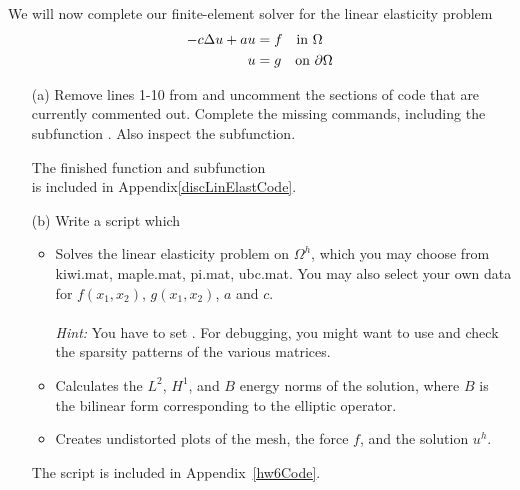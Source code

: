\begin{problem}{2}
We will now complete our finite-element solver for the linear elasticity problem
\begin{align}\label{LinElast_Strong}
\begin{split}
    -c \mbox{$\Delta$} u + au &= f \quad \text{in } \Omega \\
    u &= g \quad \text{on } \partial \Omega
\end{split}
\end{align}

\begin{itemize}
	\item[(a)] Remove lines 1-10 from  and uncomment the sections of code that are currently commented out.
	Complete the missing commands, including the subfunction . Also inspect the  subfunction.

\begin{solution}
The finished function  and subfunction \\  is included in Appendix\ref{discLinElastCode}.
\end{solution}
\pagebreak

	\item[(b)] Write a script  which
	\begin{itemize}
		\renewcommand{\labelitemii}{$\bullet$}
	    \item Solves the linear elasticity problem on $\Omega^h$, which you may choose from kiwi.mat, maple.mat, pi.mat, ubc.mat.
	    You may also select your own data for $f(x_1,x_2)$, $g(x_1,x_2)$, $a$ and $c$. \\\\
	    \textit{Hint:} You have to set .
	    For debugging, you might want to use  and check the sparsity patterns of the various matrices.
	    \item Calculates the $L^2$, $H^1$, and $B$ energy norms of the solution, where $B$ is the bilinear form corresponding to the elliptic operator.
	    \item Creates undistorted plots of the mesh, the force $f$, and the solution $u^h$.
	\end{itemize}

\begin{solution}
The script  is included in Appendix~\ref{hw6Code}.


\end{solution}
\end{itemize}
\end{problem}
